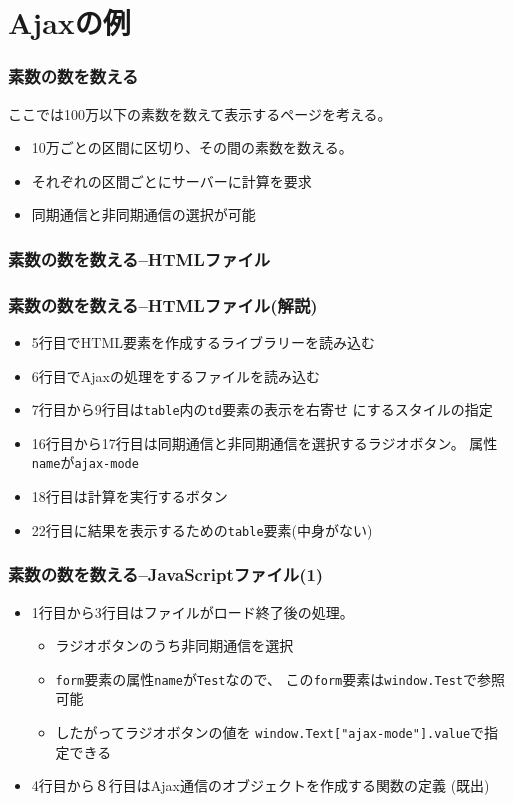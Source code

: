 \section{Ajaxの例}
\begin{frame}[containsverbatim]
 \frametitle{素数の数を数える}
 ここでは100万以下の素数を数えて表示するページを考える。
 \begin{itemize}
  \item 10万ごとの区間に区切り、その間の素数を数える。
  \item それぞれの区間ごとにサーバーに計算を要求
  \item 同期通信と非同期通信の選択が可能
 \end{itemize}
\end{frame}
\begin{frame}[containsverbatim]
 \frametitle{素数の数を数える--HTMLファイル}
\end{frame}
\begin{frame}[containsverbatim]
 \frametitle{素数の数を数える--HTMLファイル(解説)}
 \begin{itemize}
  \item 5行目でHTML要素を作成するライブラリーを読み込む
  \item 6行目でAjaxの処理をするファイルを読み込む
  \item 7行目から9行目は\texttt{table}内の\texttt{td}要素の表示を右寄せ
        にするスタイルの指定
  \item 16行目から17行目は同期通信と非同期通信を選択するラジオボタン。
        属性\texttt{name}が\texttt{ajax-mode}
  \item 18行目は計算を実行するボタン
  \item 22行目に結果を表示するための\texttt{table}要素(中身がない)
 \end{itemize}
\end{frame}
\begin{frame}[containsverbatim]
 \frametitle{素数の数を数える--JavaScriptファイル(1)}
 \begin{itemize}
  \item 1行目から3行目はファイルがロード終了後の処理。
        \begin{itemize}
         \item ラジオボタンのうち非同期通信を選択
         \item \texttt{form}要素の属性\texttt{name}が\texttt{Test}なので、
               この\texttt{form}要素は\texttt{window.Test}で参照可能
         \item したがってラジオボタンの値を
               \texttt{window.Text["ajax-mode"].value}で指定できる
        \end{itemize}
  \item 4行目から８行目はAjax通信のオブジェクトを作成する関数の定義
        (既出)
 \end{itemize}
\end{frame}
